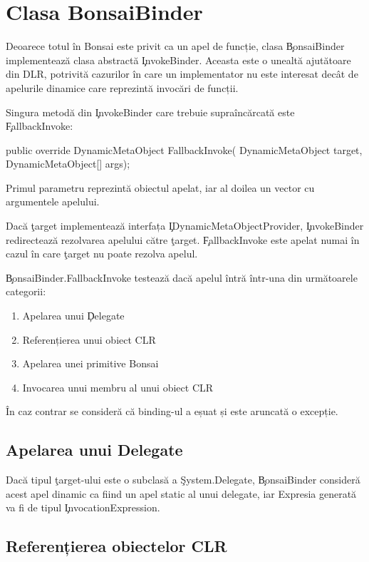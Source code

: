 \documentclass[12pt,a4paper]{memoir}
\begin{document}
\section{Clasa BonsaiBinder}

Deoarece totul în Bonsai este privit ca un apel de funcție, clasa \c{BonsaiBinder} implementează clasa abstractă \c{InvokeBinder}. Aceasta este o unealtă ajutătoare din DLR, potrivită cazurilor în care un implementator nu este interesat decât de apelurile dinamice care reprezintă invocări de funcții. 

Singura metodă din \c{InvokeBinder} care trebuie supraîncărcată este \c{FallbackInvoke}:
\begin{code}
public override DynamicMetaObject FallbackInvoke(
  DynamicMetaObject target,
  DynamicMetaObject[] args);
\end{code}
Primul parametru reprezintă obiectul apelat, iar al doilea un vector cu argumentele apelului.

Dacă \c{target} implementează interfața \c{IDynamicMetaObjectProvider}, \c{InvokeBinder} redirectează rezolvarea apelului către \c{target}. \c{FallbackInvoke} este apelat numai în cazul în care \c{target} nu poate rezolva apelul.

\c{BonsaiBinder.FallbackInvoke} testează dacă apelul întră într-una din următoarele categorii:
\begin{enumerate}
\item Apelarea unui \c{Delegate}
\item Referențierea unui obiect CLR
\item Apelarea unei primitive Bonsai
\item Invocarea unui membru al unui obiect CLR
\end{enumerate}

În caz contrar se consideră că binding-ul a eșuat și este aruncată o excepție.

\subsection{Apelarea unui Delegate}

Dacă tipul \c{target}-ului este o subclasă a \c{System.Delegate}, \c{BonsaiBinder} consideră acest apel dinamic ca fiind un apel static al unui delegate, iar Expresia generată va fi de tipul \c{InvocationExpression}.

\subsection{Referențierea obiectelor CLR}
\end{document}
